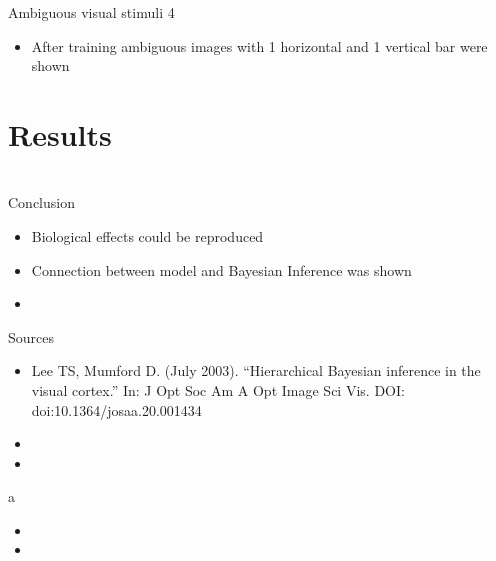 \documentclass[aspectratio=169]{beamer}
\begin{document}
\begin{frame}{Ambiguous visual stimuli 4}
 \begin{itemize}
     \item After training ambiguous images with 1 horizontal and 1 vertical bar were shown
 \end{itemize}
\end{frame}



\section{Results}



\section*{}

\begin{frame}{Conclusion}
    \begin{itemize}
    \item Biological effects could be reproduced
    \item Connection between model and Bayesian Inference was shown
    \item 
  \end{itemize}

\end{frame}

\begin{frame}{Sources}
    \begin{itemize}
    \item  Lee TS, Mumford D. (July 2003). “Hierarchical Bayesian inference in the
 visual cortex.” In: J Opt Soc Am A Opt Image Sci Vis. DOI: doi:10.1364/josaa.20.001434
    \item 
    \item 
  \end{itemize}

\end{frame}


\begin{frame}{a}
	\begin{itemize}
	  \item
	  \item
	\end{itemize}
\end{frame}
\end{document}
